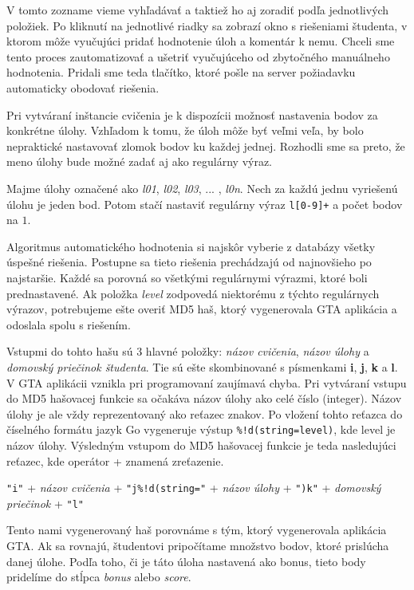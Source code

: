 V tomto zozname vieme vyhľadávať a taktiež ho aj zoradiť podľa jednotlivých položiek.
Po kliknutí na jednotlivé riadky sa zobrazí okno s riešeniami študenta, v ktorom môže vyučujúci pridať hodnotenie úloh a komentár k nemu. Chceli sme tento proces
zautomatizovať a ušetriť vyučujúceho od zbytočného manuálneho hodnotenia. Pridali sme
teda tlačítko, ktoré pošle na server požiadavku automaticky obodovať riešenia.

Pri vytváraní inštancie cvičenia je k dispozícii možnosť nastavenia bodov za konkrétne
úlohy. Vzhľadom k tomu, že úloh môže byť veľmi veľa, by bolo nepraktické nastavovať
zlomok bodov ku každej jednej. Rozhodli sme sa preto, že meno úlohy bude možné zadať
aj ako regulárny výraz.
\begin{prikl}
	Majme úlohy označené ako \textit{l01}, \textit{l02}, \textit{l03}, ... ,
	\textit{l0n}. Nech za každú jednu vyriešenú úlohu je jeden bod. Potom stačí
	nastaviť regulárny výraz \verb'l[0-9]+' a počet bodov na $1$.
\end{prikl}

Algoritmus automatického hodnotenia si najskôr vyberie z databázy všetky úspešné
riešenia. Postupne sa tieto riešenia prechádzajú od najnovšieho po najstaršie.
Každé sa porovná so všetkými regulárnymi výrazmi, ktoré boli prednastavené.
Ak položka \textit{level} zodpovedá niektorému z týchto regulárnych výrazov,
potrebujeme ešte overiť MD5 haš, ktorý vygenerovala GTA aplikácia a odoslala spolu
s riešením.

Vstupmi do tohto hašu sú 3 hlavné položky: \textit{názov cvičenia},
\textit{názov úlohy} a \textit{domovský priečinok študenta}. Tie sú ešte skombinované
s písmenkami \textbf{i}, \textbf{j}, \textbf{k} a \textbf{l}. V GTA aplikácii vznikla
pri programovaní zaujímavá chyba. Pri vytváraní vstupu do MD5 hašovacej funkcie
sa očakáva názov úlohy ako celé číslo (integer). Názov úlohy je ale vždy reprezentovaný
ako reťazec znakov. Po vložení tohto reťazca do číselného formátu jazyk Go vygeneruje
výstup \verb'%!d(string=level)',
kde level je názov úlohy.
Výsledným vstupom do MD5 hašovacej funkcie je teda nasledujúci reťazec, kde operátor
+ znamená zreťazenie.

\begin{center}
	\verb'"i"' + \textit{názov cvičenia} + \verb'"j%!d(string="' +
	\textit{názov úlohy} + \verb'")k"' + \textit{domovský priečinok} + \verb'"l"'
\end{center}

Tento nami vygenerovaný haš porovnáme s tým, ktorý vygenerovala aplikácia GTA.
Ak sa rovnajú, študentovi pripočítame množstvo bodov, ktoré prislúcha
danej úlohe. Podľa toho, či je táto úloha nastavená ako bonus, tieto body pridelíme
do stĺpca \textit{bonus} alebo \textit{score}.

